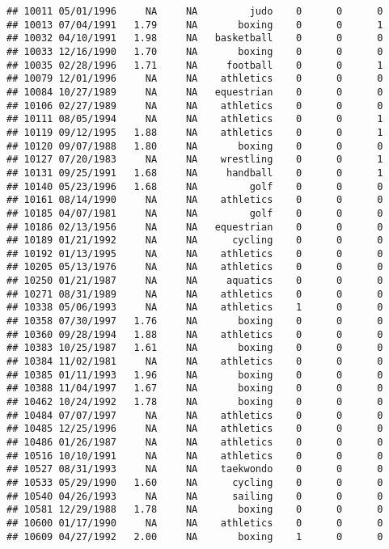 \documentclass[]{article}
\begin{document}
\begin{verbatim}
## 10011 05/01/1996     NA     NA         judo    0      0      0
## 10013 07/04/1991   1.79     NA       boxing    0      0      1
## 10032 04/10/1991   1.98     NA   basketball    0      0      0
## 10033 12/16/1990   1.70     NA       boxing    0      0      0
## 10035 02/28/1996   1.71     NA     football    0      0      1
## 10079 12/01/1996     NA     NA    athletics    0      0      0
## 10084 10/27/1989     NA     NA   equestrian    0      0      0
## 10106 02/27/1989     NA     NA    athletics    0      0      0
## 10111 08/05/1994     NA     NA    athletics    0      0      1
## 10119 09/12/1995   1.88     NA    athletics    0      0      1
## 10120 09/07/1988   1.80     NA       boxing    0      0      0
## 10127 07/20/1983     NA     NA    wrestling    0      0      1
## 10131 09/25/1991   1.68     NA     handball    0      0      1
## 10140 05/23/1996   1.68     NA         golf    0      0      0
## 10161 08/14/1990     NA     NA    athletics    0      0      0
## 10185 04/07/1981     NA     NA         golf    0      0      0
## 10186 02/13/1956     NA     NA   equestrian    0      0      0
## 10189 01/21/1992     NA     NA      cycling    0      0      0
## 10192 01/13/1995     NA     NA    athletics    0      0      0
## 10205 05/13/1976     NA     NA    athletics    0      0      0
## 10250 01/21/1987     NA     NA     aquatics    0      0      0
## 10271 08/31/1989     NA     NA    athletics    0      0      0
## 10338 05/06/1993     NA     NA    athletics    1      0      0
## 10358 07/30/1997   1.76     NA       boxing    0      0      0
## 10360 09/28/1994   1.88     NA    athletics    0      0      0
## 10383 10/25/1987   1.61     NA       boxing    0      0      0
## 10384 11/02/1981     NA     NA    athletics    0      0      0
## 10385 01/11/1993   1.96     NA       boxing    0      0      0
## 10388 11/04/1997   1.67     NA       boxing    0      0      0
## 10462 10/24/1992   1.78     NA       boxing    0      0      0
## 10484 07/07/1997     NA     NA    athletics    0      0      0
## 10485 12/25/1996     NA     NA    athletics    0      0      0
## 10486 01/26/1987     NA     NA    athletics    0      0      0
## 10516 10/10/1991     NA     NA    athletics    0      0      0
## 10527 08/31/1993     NA     NA    taekwondo    0      0      0
## 10533 05/29/1990   1.60     NA      cycling    0      0      0
## 10540 04/26/1993     NA     NA      sailing    0      0      0
## 10581 12/29/1988   1.78     NA       boxing    0      0      0
## 10600 01/17/1990     NA     NA    athletics    0      0      0
## 10609 04/27/1992   2.00     NA       boxing    1      0      0

\end{verbatim}
\end{document}
